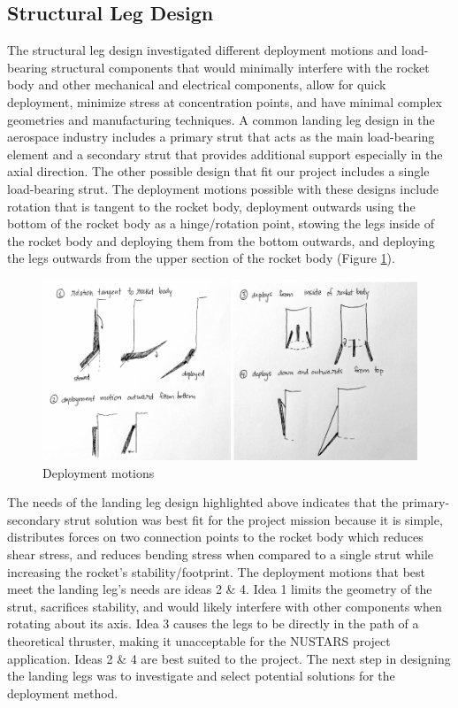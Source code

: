 \subsection{Structural Leg Design}

The structural leg design investigated different deployment motions and load-bearing structural components that would minimally interfere with the rocket body and other mechanical and electrical components, allow for quick deployment, minimize stress at concentration points, and have minimal complex geometries and manufacturing techniques. A common landing leg design in the aerospace industry includes a primary strut that acts as the main load-bearing element and a secondary strut that provides additional support especially in the axial direction. The other possible design that fit our project includes a single load-bearing strut. The deployment motions possible with these designs include rotation that is tangent to the rocket body, deployment outwards using the bottom of the rocket body as a hinge/rotation point, stowing the legs inside of the rocket body and deploying them from the bottom outwards, and deploying the legs outwards from the upper section of the rocket body (Figure \ref{figs:dm}).

\begin{figure}[H]
\centering
\includegraphics[scale=0.8]{src/figs/deploymentmotions.png}
\caption{Deployment motions}
\label{figs:dm}
\end{figure}

The needs of the landing leg design highlighted above indicates that the primary-secondary strut solution was best fit for the project mission because it is simple, distributes forces on two connection points to the rocket body which reduces shear stress, and reduces bending stress when compared to a single strut while increasing the rocket's stability/footprint. The deployment motions that best meet the landing leg's needs are ideas 2 \& 4. Idea 1 limits the geometry of the strut, sacrifices stability, and would likely interfere with other components when rotating about its axis. Idea 3 causes the legs to be directly in the path of a theoretical thruster, making it unacceptable for the NUSTARS project application. Ideas 2 \& 4 are best suited to the project. The next step in designing the landing legs was to investigate and select potential solutions for the deployment method.


